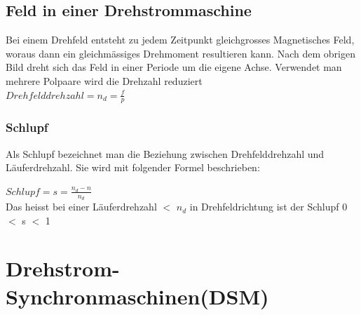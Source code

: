 	\subsection{Feld in einer Drehstrommaschine}
		\begin{minipage}{7cm}
        \end{minipage}
		\begin{minipage}{11cm}
	 		Bei einem Drehfeld entsteht zu jedem Zeitpunkt gleichgrosses Magnetisches Feld,
			woraus dann ein gleichmässiges Drehmoment resultieren kann. Nach dem
			obrigen Bild dreht sich das Feld in einer Periode um die eigene Achse. Verwendet
			man mehrere Polpaare wird die Drehzahl reduziert\\
			$Drehfelddrehzahl  = n_d =\frac{f}{p}$ \\
        \end{minipage}
		\subsubsection{Schlupf}
			Als Schlupf bezeichnet man die Beziehung zwischen Drehfelddrehzahl und
			Läuferdrehzahl. Sie wird mit folgender Formel beschrieben:\\
			\begin{minipage}{8cm}
				$Schlupf = s = \frac{n_d - n}{n_d}$\\
				Das heisst bei einer Läuferdrehzahl $<$ $n_d$ in Drehfeldrichtung ist der Schlupf
				0 $<$ s $<$ 1
			\end{minipage}
			\begin{minipage}{9cm}
			\end{minipage}
	
\newpage

\section{Drehstrom- Synchronmaschinen(DSM)}
